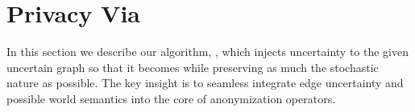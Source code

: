 \section{Privacy Via {\methodName}}
In this section we describe our algorithm, {\methodName}, which injects uncertainty to the given uncertain graph so that it becomes {\keobf} while preserving as much the stochastic nature as possible. The key insight is to seamless integrate edge uncertainty and possible world semantics into the core of anonymization operators. 


% 

